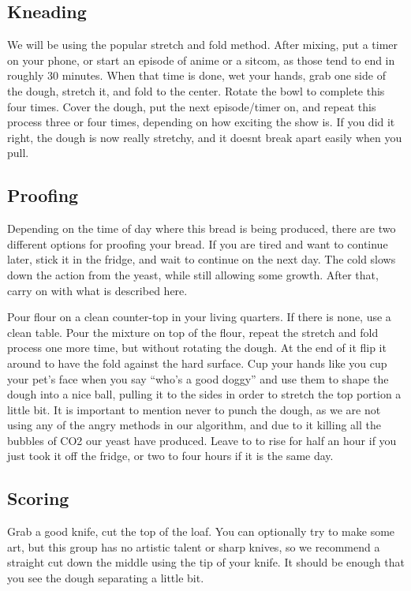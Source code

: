 \documentclass[acmtog, nonacm]{acmart}
\begin{document}
\subsection{Kneading}
We will be using the popular stretch and fold method. 
After mixing, put a timer on your phone, or start an episode of anime or a sitcom, as those tend to end in roughly 30 minutes. 
When that time is done, wet your hands, grab one side of the dough, stretch it, and fold to the center. Rotate the bowl to complete this four times. 
Cover the dough, put the next episode/timer on, and repeat this process three or four times, depending on how exciting the show is.
If you did it right, the dough is now really stretchy, and it doesnt break apart easily when you pull. 

\subsection{Proofing}
Depending on the time of day where this bread is being produced, there are two different options for proofing your bread. 
If you are tired and want to continue later, stick it in the fridge, and wait to continue on the next day. 
The cold slows down the action from the yeast, while still allowing some growth. 
After that, carry on with what is described here.

Pour flour on a clean counter-top in your living quarters. 
If there is none, use a clean table. 
Pour the mixture on top of the flour, repeat the stretch and fold process one more time, but without rotating the dough.
At the end of it flip it around to have the fold against the hard surface.
Cup your hands like you cup your pet's face when you say ``who's a good doggy'' and use them to shape the dough into a nice ball, pulling it to the sides in order to stretch the top portion a little bit. 
It is important to mention never to punch the dough, as we are not using any of the angry methods in our algorithm, and due to it killing all the bubbles of CO2 our yeast have produced. 
Leave to to rise for half an hour if you just took it off the fridge, or two to four hours if it is the same day. 

\subsection{Scoring}
Grab a good knife, cut the top of the loaf. 
You can optionally try to make some art, but this group has no artistic talent or sharp knives, so we recommend a straight cut down the middle using the tip of your knife. 
It should be enough that you see the dough separating a little bit. 
\end{document}
